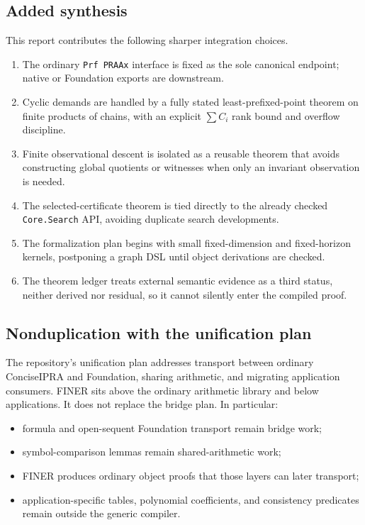 \subsection{Added synthesis}

This report contributes the following sharper integration choices.

\begin{enumerate}[label=(\arabic*),leftmargin=2.3em]
\item The ordinary \texttt{Prf PRAAx} interface is fixed as the sole canonical endpoint; native or Foundation exports are downstream.
\item Cyclic demands are handled by a fully stated least-prefixed-point theorem on finite products of chains, with an explicit \(\sum C_i\) rank bound and overflow discipline.
\item Finite observational descent is isolated as a reusable theorem that avoids constructing global quotients or witnesses when only an invariant observation is needed.
\item The selected-certificate theorem is tied directly to the already checked \texttt{Core.Search} API, avoiding duplicate search developments.
\item The formalization plan begins with small fixed-dimension and fixed-horizon kernels, postponing a graph DSL until object derivations are checked.
\item The theorem ledger treats external semantic evidence as a third status, neither derived nor residual, so it cannot silently enter the compiled proof.
\end{enumerate}

\subsection{Nonduplication with the unification plan}

The repository's unification plan addresses transport between ordinary ConciseIPRA and Foundation, sharing arithmetic, and migrating application consumers.  FINER sits above the ordinary arithmetic library and below applications.  It does not replace the bridge plan.  In particular:
\begin{itemize}[leftmargin=2em]
\item formula and open-sequent Foundation transport remain bridge work;
\item symbol-comparison lemmas remain shared-arithmetic work;
\item FINER produces ordinary object proofs that those layers can later transport;
\item application-specific tables, polynomial coefficients, and consistency predicates remain outside the generic compiler.
\end{itemize}

